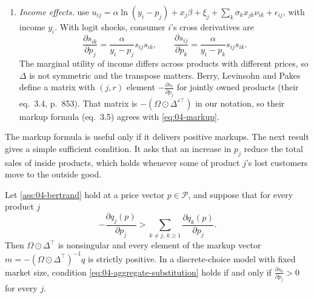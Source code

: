 \begin{remark}
\begin{enumerate}[label=(\roman*)]
  $\int\alpha_i s_{ij}s_{ik}\,dF(i)$ is again symmetric.
  \item \emph{Income effects.} \citet[eq.~2.7a, p.~849]{BerryLevinsohnPakes1995} use
  $u_{ij} = \alpha\ln(y_i - p_j) + x_j\beta + \xi_j + \sum_k\sigma_kx_{jk}\nu_{ik} + \epsilon_{ij}$, with income
  $y_i$. With logit shocks, consumer $i$'s cross derivatives are
  \begin{equation*}
  \frac{\partial s_{ik}}{\partial p_j} = \frac{\alpha}{y_i - p_j}s_{ij}s_{ik},
  \qquad
  \frac{\partial s_{ij}}{\partial p_k} = \frac{\alpha}{y_i - p_k}s_{ij}s_{ik}.
  \end{equation*}
  The marginal utility of income differs across products with different prices, so $\Delta$ is not symmetric and
  the transpose matters. Berry, Levinsohn and Pakes define a matrix with $(j, r)$ element
  $-\frac{\partial s_r}{\partial p_j}$ for jointly owned products (their eq.~3.4, p.~853). That matrix is
  $-(\Omega \odot \Delta^{s\top})$ in our notation, so their markup formula (eq.~3.5) agrees with
  \eqref{eq:04-markup}.
\end{enumerate}
\end{remark}

The markup formula is useful only if it delivers positive markups. The next result gives a simple sufficient
condition. It asks that an increase in $p_j$ reduce the total sales of inside products, which holds whenever some
of product $j$'s lost customers move to the outside good.

\begin{proposition}\label{prop:04-markup-positive}
Let \cref{ass:04-bertrand} hold at a price vector $p \in \mathcal{P}$, and suppose that for every product $j$
\begin{equation}\label{eq:04-aggregate-substitution}
-\frac{\partial q_j(p)}{\partial p_j} > \sum_{k \ne j,\, k \ge 1}\frac{\partial q_k(p)}{\partial p_j}.
\end{equation}
Then $\Omega \odot \Delta^\top$ is nonsingular and every element of the markup vector
$m = -(\Omega \odot \Delta^\top)^{-1}q$ is strictly positive. In a discrete-choice model with fixed market size,
condition \eqref{eq:04-aggregate-substitution} holds if and only if $\frac{\partial s_0}{\partial p_j} > 0$ for
every $j$.
\end{proposition}

